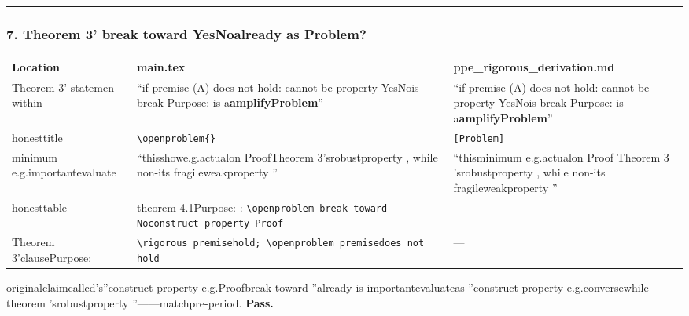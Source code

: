 \documentclass[
  12pt,
]{article}
\begin{document}
\begin{center}\rule{0.5\linewidth}{0.5pt}\end{center}

\subsubsection{7. Theorem 3'
break toward YesNoalready as Problem?}\label{theorem-3-ux7834ux574fux65b9ux5411ux662fux5426ux5df2ux6539ux4e3aux5f00ux653eux95eeux9898}

\begin{longtable}[]{@{}
  >{\raggedright\arraybackslash}p{}
  >{\raggedright\arraybackslash}p{}
  >{\raggedright\arraybackslash}p{}@{}}
\toprule\noalign{}
\begin{minipage}[b]{\linewidth}\raggedright
Location
\end{minipage} & \begin{minipage}[b]{\linewidth}\raggedright
main.tex
\end{minipage} & \begin{minipage}[b]{\linewidth}\raggedright
ppe\_rigorous\_derivation.md
\end{minipage} \\
\midrule\noalign{}
\endhead
\bottomrule\noalign{}
\endlastfoot
Theorem 3' statemen within & ``if premise (A) does not hold:
cannot be property YesNois break Purpose: is a\textbf{amplifyProblem}'' & ``if premise (A) does not hold:
cannot be property YesNois break Purpose: is a\textbf{amplifyProblem}'' \\
honesttitle  & \texttt{\textbackslash{}openproblem\{\}} &
\texttt{{[}Problem{]}} \\
minimum e.g.importantevaluate & ``thisshowe.g.actualon ProofTheorem 3'srobustproperty , while non-its fragileweakproperty '' &
``thisminimum e.g.actualon Proof Theorem 3 'srobustproperty , while non-its fragileweakproperty '' \\
honesttable & theorem 4.1Purpose: :
\texttt{\textbackslash{}openproblem\ break toward Noconstruct property Proof} & --- \\
Theorem 3'clausePurpose:  &
\texttt{\textbackslash{}rigorous\ premisehold;\ \textbackslash{}openproblem\ premisedoes not hold}
& --- \\
\end{longtable}

originalclaimcalled's''construct property e.g.Proofbreak toward ''already is importantevaluateas ''construct property e.g.conversewhile theorem 'srobustproperty ''------matchpre-period. \textbf{Pass.}
\end{document}

